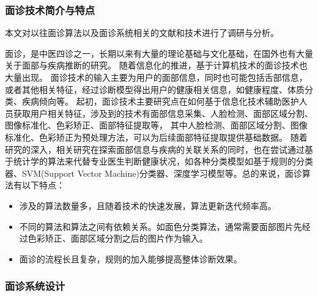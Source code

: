 \subsubsection{面诊技术简介与特点}
本文对以往面诊算法以及面诊系统相关的文献和技术进行了调研与分析。

面诊，是中医四诊之一，长期以来有大量的理论基础与文化基础，在国外也有大量关于面部与疾病推断的研究。
随着信息化的推进，基于计算机技术的面诊技术也大量出现。
面诊技术的输入主要为用户的面部信息，同时也可能包括舌部信息，或者其他相关特征，经过诊断模型得出用户的健康相关信息，如健康程度、体质分类、疾病倾向等。
起初，面诊技术主要研究点在如何基于信息化技术辅助医护人员获取用户相关特征，涉及到的技术有面部信息采集、人脸检测、面部区域分割、图像标准化、色彩矫正、面部特征提取等\cite{宋海贝2018中医面诊信息自动识别方法研究进展}，
其中人脸检测、面部区域分割、图像标准化、色彩矫正为预处理方法，可以为后续面部特征提取提供基础数据。
随着研究的深入，相关研究在探索面部信息与疾病的关联关系的同时，也在尝试通过基于统计学的算法来代替专业医生判断健康状况，如各种分类模型如基于规则的分类器、SVM(Support Vector Machine)分类器、深度学习模型等\cite{林锋2019中医面诊系统调研报告}。总的来说，面诊算法有以下特点：
\begin{itemize}
    \item 涉及的算法数量多，且随着技术的快速发展，算法更新迭代频率高。
    \item 不同的算法和算法之间有依赖关系。如面色分类算法，通常需要面部图片先经过色彩矫正、面部区域分割之后的图片作为输入。
    \item 面诊的流程长且复杂，规则的加入能够提高整体诊断效果。
\end{itemize}

\subsubsection{面诊系统设计}



